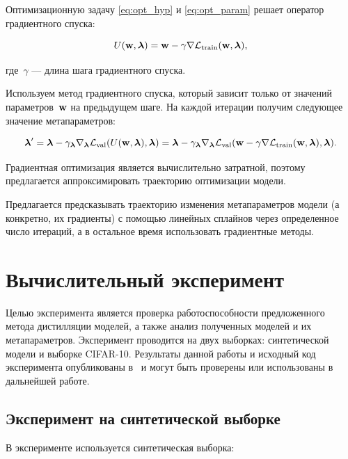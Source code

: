\documentclass[12pt, twoside]{article}
\begin{document}
Оптимизационную задачу \eqref{eq:opt_hyp} и \eqref{eq:opt_param} решает оператор градиентного спуска:

\begin{equation} \label{eq:operator}
    U(\bw, \boldsymbol{\lambda}) = \bw - \gamma\nabla\cL_\text{train}(\bw, \boldsymbol{\lambda}),
\end{equation}

\noindent
где~$\gamma$ — длина шага градиентного спуска.

\noindent
Используем метод градиентного спуска, который зависит только от значений параметров~$\mathbf{w}$ на предыдущем шаге. На каждой итерации получим следующее значение метапараметров:

\begin{equation} \label{eq:hyp_alg}
    \boldsymbol{\lambda}^\prime = \boldsymbol{\lambda} - \gamma_{\boldsymbol{\lambda}}\nabla_{\boldsymbol{\lambda}}\cL_\text{val}(U(\bw, \boldsymbol{\lambda}), \boldsymbol{\lambda}) = \boldsymbol{\lambda} - \gamma_{\boldsymbol{\lambda}}\nabla_{\boldsymbol{\lambda}}\cL_\text{val}(\bw - \gamma\nabla\cL_\text{train}(\bw, \boldsymbol{\lambda}), \boldsymbol{\lambda}).
\end{equation}

Градиентная оптимизация является вычислительно затратной, поэтому предлагается аппроксимировать траекторию оптимизации модели. 

\noindent
Предлагается предсказывать траекторию изменения метапараметров модели (а конкретно, их градиенты) с помощью линейных сплайнов через определенное число итераций, а в остальное время использовать градиентные методы.

\section{Вычислительный эксперимент}

Целью эксперимента является проверка работоспособности предложенного метода дистилляции моделей, а также анализ полученных моделей и их метапараметров. Эксперимент проводится на двух выборках: синтетической модели и выборке CIFAR-10. Результаты данной работы и исходный код эксперимента опубликованы в~\cite{distknow} и могут быть проверены или использованы в дальнейшей работе.

\subsection{Эксперимент на синтетической выборке}
В эксперименте используется синтетическая выборка:
\end{document}
